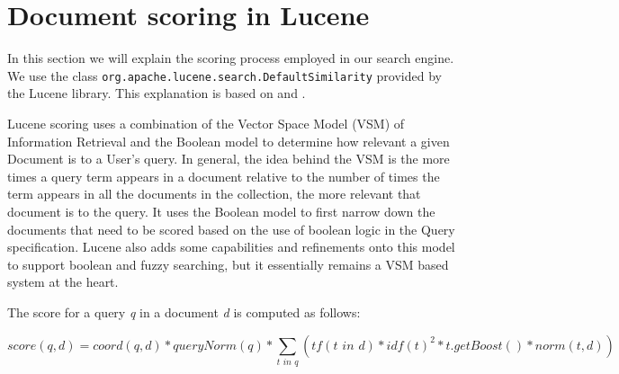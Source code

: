 \chapter{Document scoring in Lucene}
\label{appendix:score-lucene}

In this section we will explain the scoring process employed in our search
engine. We use the class \verb|org.apache.lucene.search.DefaultSimilarity|
provided by the Lucene library. 
This explanation is based on \cite{lucene-scoring-explanation} and
\cite{lucene-scoring-formula}.

Lucene scoring uses a combination of the Vector Space Model (VSM) of
Information Retrieval and the Boolean model to determine how relevant a given 
Document is to a User's query. In general, the idea behind the VSM is the more 
times a query term appears in a document relative to the number of times the
term  appears in all the documents in the collection, the more relevant that 
document is to the query. It uses the Boolean model to first narrow down the 
documents that need to be scored based on the use of boolean logic in the Query
specification. Lucene also adds some capabilities and refinements onto this
model to support boolean and fuzzy searching, but it essentially remains a VSM 
based system at the heart.

The score for a query \emph{q} in a document \emph{d} is computed as follows:

\[
score(q,d) =  coord(q,d) * queryNorm(q)  * \sum_{t\phantom{i}in\phantom{i}
q}(tf(t\phantom{i}in\phantom{i}d) * idf(t)^2 * t.getBoost() * norm(t,d))
\]

